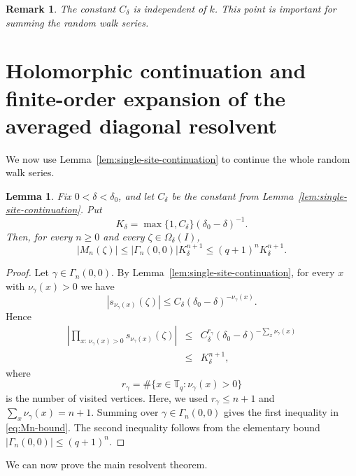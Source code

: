\documentclass[a4paper,11pt]{article}
\newtheorem{lem}[thm]{Lemma}
\newtheorem{rem}[thm]{Remark}
\begin{document}
\begin{rem}
The constant $C_\delta$ is independent of $k$. 
This point is important for summing the random walk series.
\end{rem}


\section{Holomorphic continuation and finite-order expansion of the averaged diagonal resolvent}

We now use Lemma~\ref{lem:single-site-continuation} to continue the
whole random walk series.

\begin{lem}
\label{lem:Mn-bound}
Fix $0<\delta<\delta_0$, and let $C_\delta$ be the constant from
Lemma~\ref{lem:single-site-continuation}. Put
$$
K_\delta
=
\max\{1,C_\delta\}(\delta_0-\delta)^{-1}.
$$
Then, for every $n\ge0$ and every $\zeta\in\Omega_\delta(I)$,
\begin{equation}
\label{eq:Mn-bound}
|M_n(\zeta)|
\le
|\Gamma_n(0,0)|K_\delta^{n+1}
\le
(q+1)^nK_\delta^{n+1}.
\end{equation}
\end{lem}

\begin{proof}
Let $\gamma\in\Gamma_n(0,0)$. By
Lemma~\ref{lem:single-site-continuation}, for every $x$ with
$\nu_\gamma(x)>0$ we have
$$
|s_{\nu_\gamma(x)}(\zeta)|
\le
C_\delta(\delta_0-\delta)^{-\nu_\gamma(x)}.
$$
Hence
\begin{eqnarray}
\left|
\prod_{x:\,\nu_\gamma(x)>0}s_{\nu_\gamma(x)}(\zeta)
\right|
&\le&
C_\delta^{r_\gamma}
(\delta_0-\delta)^{-\sum_x\nu_\gamma(x)}
\nonumber\\
&\le&
K_\delta^{n+1},
\label{eq:walk-monomial-bound}
\end{eqnarray}
where
$$
r_\gamma=\#\{x\in\mathbb T_q:\nu_\gamma(x)>0\}
$$
is the number of visited vertices.
Here, we used $r_\gamma\le n+1$ and $\sum_x\nu_\gamma(x)=n+1$.
Summing over $\gamma\in\Gamma_n(0,0)$ gives the first inequality in \eqref{eq:Mn-bound}. 
The second inequality follows from the elementary bound $|\Gamma_n(0,0)|\le(q+1)^n$.
\end{proof}

We can now prove the main resolvent theorem.
\end{document}

